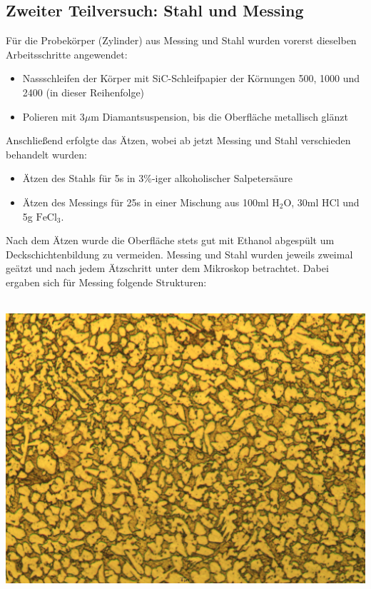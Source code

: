\documentclass[german,  %
parskip=full,  %
]{scrartcl}
\begin{document}
\subsection{Zweiter Teilversuch: Stahl und Messing}
Für die Probekörper (Zylinder) aus Messing und Stahl wurden vorerst dieselben Arbeitsschritte angewendet:
\begin{itemize}
\item Nassschleifen der Körper mit SiC-Schleifpapier der Körnungen 500, 1000 und 2400 (in dieser Reihenfolge)
\item Polieren mit 3\(\mu\)m Diamantsuspension, bis die Oberfläche metallisch glänzt
\end{itemize}
Anschließend erfolgte das Ätzen, wobei ab jetzt Messing und Stahl verschieden behandelt wurden:
\begin{itemize}
\item Ätzen des Stahls für 5s in 3\%-iger alkoholischer Salpetersäure
\item Ätzen des Messings für 25s in einer Mischung aus 100ml \(\mathrm{H}_2\mathrm{O}\), 30ml \(\mathrm{HCl}\) und 5g \(\mathrm{FeCl}_3\). 
\end{itemize}
Nach dem Ätzen wurde die Oberfläche stets gut mit Ethanol abgespült um Deckschichtenbildung zu vermeiden. Messing und Stahl wurden jeweils zweimal geätzt und nach jedem Ätzschritt unter dem Mikroskop betrachtet. Dabei ergaben sich für Messing folgende Strukturen: \\\\
\begin{minipage}{0.45\textwidth}\centering
\includegraphics[scale=0.1]{Me_1Sch_25s_10x_001.jpg}
\end{minipage}
\end{document}

